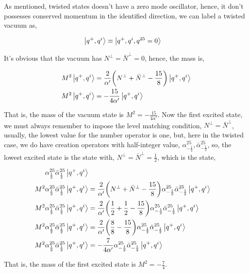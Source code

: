 \probitem{}

As mentioned, twisted states doesn't have a zero mode oscillator, hence, it don't possesses conserved momentum in the identified direction, 
we can label a twisted vacuum as,

\begin{align*}
    \ket{q^+,q^i}&\equiv\ket{q^+,q^i,q^{25}=0}
\end{align*}

It's obvious that the vacuum has $N^\perp={\bar N}^\perp=0$, hence, the mass is,

\begin{align*}
    M^2\ket{q^+,q^i}&=\frac{2}{\alpha'}\qty(N^\perp+{\bar N}^\perp-\frac{15}{8})\ket{q^+,q^i}\\
    M^2\ket{q^+,q^i}&=-\frac{15}{4\alpha'}\ket{q^+,q^i}
\end{align*}

That is, the mass of the vacuum state is $M^2=-\frac{15}{4\alpha'}$. Now the first excited state, 
we must always remember to impose the level matching condition, $N^\perp={\bar N}^\perp$, usually, the 
lowest value for the number operator is one, but, here in the twisted case, we do have creation operators with 
half-integer value, $\alpha_{-\frac12}^{25},{\bar\alpha}_{-\frac12}^{25}$, so, the lowest excited state is the state with, 
$N^\perp={\bar N}^\perp=\frac12$, which is the state,

\begin{align*}
    \alpha_{\frac12}^{25}{\bar\alpha}_{\frac12}^{25}\ket{q^+,q^i}\\
    M^2\alpha_{\frac12}^{25}{\bar\alpha}_{\frac12}^{25}\ket{q^+,q^i}&=\frac{2}{\alpha'}\qty(N^\perp+{\bar N}^\perp-\frac{15}{8})\alpha_{-\frac12}^{25}{\bar\alpha}_{-\frac12}^{25}\ket{q^+,q^i}\\
    M^2\alpha_{\frac12}^{25}{\bar\alpha}_{\frac12}^{25}\ket{q^+,q^i}&=\frac{2}{\alpha'}\qty(\frac12+\frac12-\frac{15}{8})\alpha_{-\frac12}^{25}{\bar\alpha}_{-\frac12}^{25}\ket{q^+,q^i}\\
    M^2\alpha_{\frac12}^{25}{\bar\alpha}_{\frac12}^{25}\ket{q^+,q^i}&=\frac{2}{\alpha'}\qty(\frac{8}{8}-\frac{15}{8})\alpha_{-\frac12}^{25}{\bar\alpha}_{-\frac12}^{25}\ket{q^+,q^i}\\
    M^2\alpha_{\frac12}^{25}{\bar\alpha}_{\frac12}^{25}\ket{q^+,q^i}&=-\frac{7}{4\alpha'}\alpha_{-\frac12}^{25}{\bar\alpha}_{-\frac12}^{25}\ket{q^+,q^i}
\end{align*}

That is, the mass of the first excited state is $M^2=-\frac74$.
